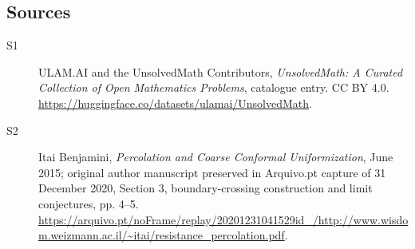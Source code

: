 \documentclass[11pt]{article}
\begin{document}
\subsection{Sources}
\begin{description}
\item[\hypertarget{source:statement:1}{S1}] ULAM.AI and the UnsolvedMath Contributors, \emph{UnsolvedMath: A Curated Collection of Open Mathematics Problems}, catalogue entry. CC BY 4.0. \url{https://huggingface.co/datasets/ulamai/UnsolvedMath}.
\item[\hypertarget{source:statement:2}{S2}] Itai Benjamini, \emph{Percolation and Coarse Conformal Uniformization}, June 2015; original author manuscript preserved in Arquivo.pt capture of 31 December 2020, Section 3, boundary-crossing construction and limit conjectures, pp. 4--5. \url{https://arquivo.pt/noFrame/replay/20201231041529id_/http://www.wisdom.weizmann.ac.il/~itai/resistance_percolation.pdf}.
\end{description}
\label{end:statement}
\end{document}
